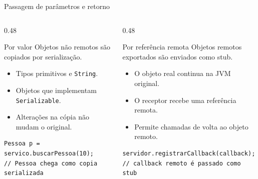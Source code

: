 \documentclass[aspectratio=169]{beamer}
\newcommand{\code}[1]{\texttt{#1}}
\begin{document}
\begin{frame}[fragile]{Passagem de parâmetros e retorno}
    \begin{columns}[T]
        \begin{column}{0.48\textwidth}
            \begin{block}{Por valor}
                Objetos não remotos são copiados por serialização.
            \end{block}
            \begin{itemize}
                \item Tipos primitivos e \code{String}.
                \item Objetos que implementam \code{Serializable}.
                \item Alterações na cópia não mudam o original.
            \end{itemize}

\begin{lstlisting}[basicstyle=\ttfamily\tiny]
Pessoa p = servico.buscarPessoa(10);
// Pessoa chega como copia serializada
\end{lstlisting}
        \end{column}

        \begin{column}{0.48\textwidth}
            \begin{block}{Por referência remota}
                Objetos remotos exportados são enviados como stub.
            \end{block}
            \begin{itemize}
                \item O objeto real continua na JVM original.
                \item O receptor recebe uma referência remota.
                \item Permite chamadas de volta ao objeto remoto.
            \end{itemize}

\begin{lstlisting}[basicstyle=\ttfamily\tiny]
servidor.registrarCallback(callback);
// callback remoto é passado como stub
\end{lstlisting}
        \end{column}
    \end{columns}
\end{frame}
\end{document}
